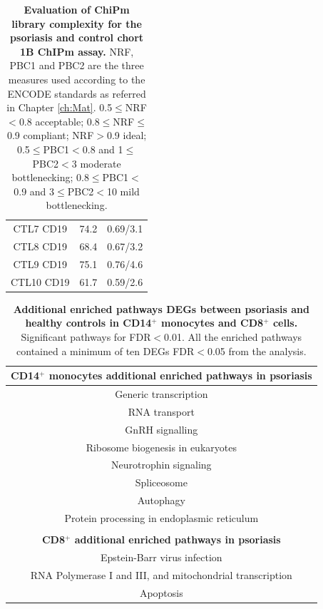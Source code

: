 \begin{table}[htbp]
\begin{tabular}{@{} c c c}
CTL7	CD19  & 74.2	& 0.69/3.1\\
CTL8	CD19  & 68.4  &	0.67/3.2\\
CTL9	CD19  & 75.1  &	0.76/4.6\\
CTL10	CD19  & 61.7  & 0.59/2.6\\
\bottomrule
\end{tabular}
\medskip %
\caption[Evaluation of ChiPm library complexity for the psoriasis and control chort 1B ChIPm assay.]{\textbf{Evaluation of ChiPm library complexity for the psoriasis and control chort 1B ChIPm assay.} NRF, PBC1 and PBC2 are the three measures used according to the ENCODE standards as referred in Chapter \ref{ch:Mat}. 0.5$\leq$NRF$<$0.8 acceptable; 0.8$\leq$NRF$\leq$0.9 compliant; NRF$>$0.9 ideal; 0.5$\leq$PBC1$<$0.8 and 1$\leq$PBC2$<$3 moderate bottlenecking; 0.8$\leq$PBC1$<$0.9 and 3$\leq$PBC2$<$10 mild bottlenecking.}
\label{tab:ChIPm_PS_CTL_library_complexity}
\end{table}
\bigskip %

\begin{table}[htbp]
\centering
\begin{tabular}{@{} c }
\toprule
\textbf{CD14$^+$ monocytes additional enriched pathways in psoriasis} \\
\midrule
\midrule
Generic transcription \\
RNA transport \\
GnRH signalling \\
Ribosome biogenesis in eukaryotes \\
Neurotrophin signaling \\
Spliceosome \\
Autophagy \\
Protein processing in endoplasmic reticulum \\
                        \\
\textbf{CD8$^+$ additional enriched pathways in psoriasis} \\
\midrule
\midrule
Epstein-Barr virus infection \\
RNA Polymerase I and III, and mitochondrial transcription\\
Apoptosis \\
\bottomrule
\end{tabular}
\medskip %
\caption[Additional enriched pathways for DEGs between psoriasis and healthy controls in CD14$^+$ monocytes and CD8$^+$ cells.]{\textbf{Additional enriched pathways DEGs between psoriasis and healthy controls in CD14$^+$ monocytes and CD8$^+$ cells.} Significant pathways for FDR$<$0.01. All the enriched pathways contained a minimum of ten DEGs FDR$<$0.05 from the analysis.}
\label{tab:RNAseq_PS_CTL_additional_pathways}
\end{table}



